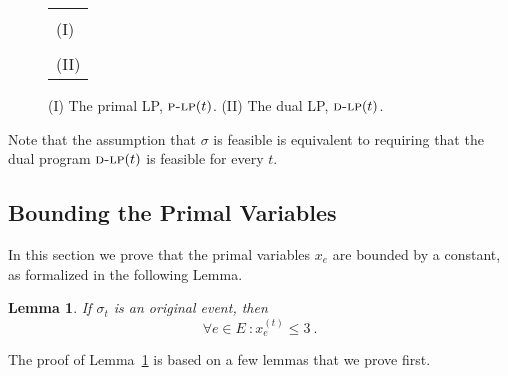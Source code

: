 \documentclass[11pt]{article}
\newenvironment{proof sketch}[1]{\noindent {\emph{Proof sketch of #1:}}}{\hfill \qed}
\newtheorem{lemma}{Lemma}
\newcommand{\dlp}{\textsc{d-lp}}
\newcommand{\plp}{\textsc{p-lp}}
\newcommand{\event}{\text{$\sigma$}}
\newcommand{\alive}{\text{\textit{Alive}}}
\begin{document}
\begin{figure}
\centering
\begin{tabular}{| l |}
\hline
\begin{minipage}{0.67\textwidth}
     \begin{center}
        \begin{eqnarray*}
        \underline{\plp(t)}:~~ \min~  \sum_{r_k \in \alive_t} z_k +\sum_{e\in E} x_{e} &\text{s.t.}& \\
         \forall r_k\in \alive_t ~\forall p \in \Gamma_k: z_k + \sum_{e\in p}\frac{x_{e}}{c_e}  &\geq& 1\text{ \footnotesize (Covering Constraints.)}\\
          x&\geq& \vec{0}
        \end{eqnarray*} \\
        (I)
     \end{center}
    \end{minipage}
\\
\hline
\begin{minipage}{0.67\textwidth}
     \begin{center}
        \begin{eqnarray*}
         \underline{\dlp(t)}:~~~~~\max~ \sum_{r_k \in \alive_t} \sum_{p \in \Gamma_k} f_k(p) &\text{s.t.}&\\
         \forall e\in E: \frac{1}{c_e} \cdot \sum_{r_k \in \alive_t} \sum_{\{p \mid p\in \Gamma_k, e \in p\}}f_k(p)&\leq& 1\text{ \footnotesize (Capacity Constraints.)} \\
         \forall r_k\in \alive_t: \sum_{p \in \Gamma_k}f_k(p) & = & 1\text{ \footnotesize (Demand Constraints.)}\\ f &\geq& \vec{0}
        \end{eqnarray*}
        \\(II)
     \end{center}
    \end{minipage}
    \\
\hline
\end{tabular}
\caption{
(I) The primal LP, $\plp(t)$.
(II) The dual LP, $\dlp(t)$.}
   \label{fig:LPframe}
\end{figure}

Note that the assumption that $\event$ is feasible is equivalent to requiring that
the dual program $\dlp(t)$ is feasible for every $t$.

\subsection{Bounding the Primal Variables}\label{sec:proof}\label{sec:proofof5}
In this section we prove  that the primal variables $x_e$ are bounded by a constant, as formalized in the following Lemma.
 \begin{lemma}\label{lemma:x ub}
If $\sigma_t$ is an original event, then
  $$\forall e \in E~:x_{e}^{(t)} \leq 3\:.$$
\end{lemma}
\noindent
The proof of Lemma~\ref{lemma:x ub} is based on a few lemmas that we prove first.
\end{document}
